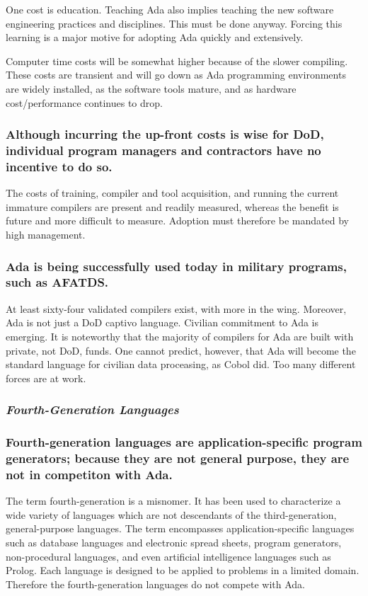 \documentclass[12pt]{article}
\begin{document}
One cost is education. Teaching Ada also implies teaching the new software
engineering practices and disciplines. This must be done anyway. Forcing this
learning is a major motive for adopting Ada quickly and extensively.

Computer time costs will be somewhat higher because of the slower compiling.
These costs are transient and will go down as Ada programming environments are
widely installed, as the software tools mature, and as hardware
cost/performance continues to drop.

\subsubsection*{Although incurring the up-front costs is wise for DoD,
individual program managers and contractors have no incentive to do so.}

The costs of training, compiler and tool acquisition, and running the current
immature compilers are present and readily measured, whereas the benefit is
future and more difficult to measure. Adoption must therefore be mandated by
high management.

\subsubsection*{Ada is being successfully used today in military programs, such
as AFATDS.}

At least sixty-four validated compilers exist, with more in the wing. Moreover,
Ada is not just a DoD captivo language. Civilian commitment to Ada is emerging.
It is noteworthy that the majority of compilers for Ada are built with private,
not DoD, funds.  One cannot predict, however, that Ada will become the standard
language for civilian data proceasing, as Cobol did. Too many different forces
are at work.

\subsubsection*{\textit{Fourth-Generation Languages}}

\subsubsection*{Fourth-generation languages are application-specific program
generators; because they are not general purpose, they are not in competiton
with Ada.}

The term fourth-generation is a misnomer. It has been used to characterize a
wide variety of languages which are not descendants of the third-generation,
general-purpose languages. The term encompasses application-specific languages
such as database languages and electronic spread sheets, program generators,
non-procedural languages, and even artificial intelligence languages such as
Prolog. Each language is designed to be applied to problems in a limited
domain. Therefore the fourth-generation languages do not compete with Ada.
\end{document}
